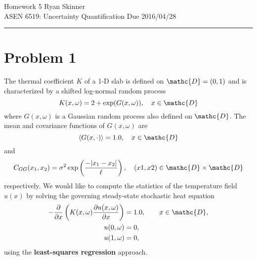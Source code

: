 \documentclass[11pt]{article}
\begin{document}
\newcommand{\widesim}[2][1.5]{
  \mathrel{\overset{#2}{\scalebox{#1}[1]{$\sim$}}}
}

\pagestyle{fancyplain}
\lhead{}
\chead{}
\rhead{}
\cfoot{\hrule \thepage}

\noindent
{\Large Homework 5}
\hfill
{\large Ryan Skinner}
\\[0.5ex]
{\large ASEN 6519: Uncertainty Quantification}
\hfill
{\large Due 2016/04/28}\\
\hrule
\vspace{6pt}

\section*{Problem 1} %

The thermal coefficient $K$ of a 1-D slab is defined on $\mathc{D} = (0,1)$ and is characterized by a shifted log-normal random process
\begin{equation}
K(x,\omega) = 2 + \exp(G(x,\omega)), \quad x \in \mathc{D}
\end{equation}
where $G(x,\omega)$ is a Gaussian random process also defined on $\mathc{D}$. The mean and covariance functions of $G(x,\omega)$ are
\begin{equation}
\xpect{G(x,\cdot)} = 1.0, \quad x \in \mathc{D}
\end{equation}
and
\begin{equation}
C_{GG}(x_1,x_2) = \sigma^2 \exp \left( \frac{- | x_1-x_2 | }{\ell} \right), \quad (x1,x2) \in \mathc{D} \times \mathc{D}
\end{equation}
respectively. We would like to compute the statistics of the temperature field $u(x)$ by solving the governing steady-state stochastic heat equation
\begin{equation}
\begin{aligned}
-\pp{}{x} \left( K(x,\omega) \pp{u(x,\omega)}{x} \right) &= 1.0, \qquad x \in \mathc{D}, \\
u(0,\omega) &= 0, \\
u(1,\omega) &= 0,
\end{aligned}
\label{eq:pde}
\end{equation}
using the \textbf{least-squares regression} approach.
\end{document}
